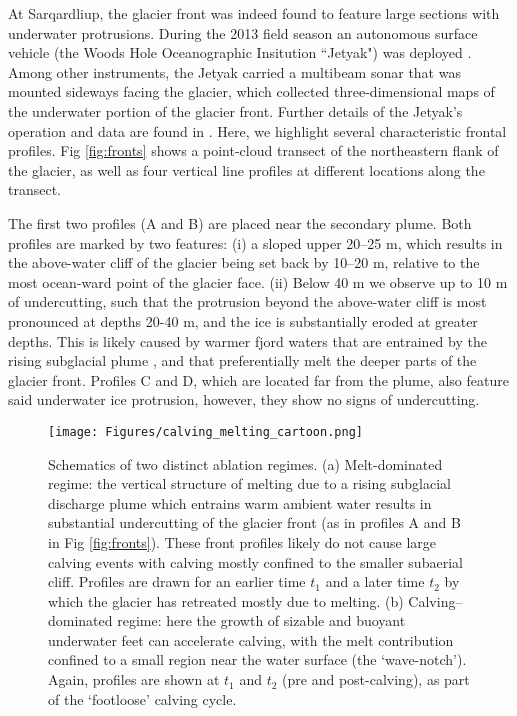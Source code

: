 \documentclass[10pt,letterpaper]{article}
\begin{document}
At Sarqardliup, the glacier front was indeed found to feature large sections with underwater protrusions. During the 2013 field season an autonomous surface vehicle (the Woods Hole Oceanographic Insitution ``Jetyak") was deployed \citep{Kimball:kr,Mankoff:2016jp}.
Among other instruments, the Jetyak carried a multibeam sonar that was mounted sideways facing the glacier, which collected three-dimensional maps of the underwater portion of the glacier front. Further details of the Jetyak's operation and data are found in \cite{Kimball:kr}. Here, we highlight several characteristic frontal profiles. Fig \ref{fig:fronts} shows a point-cloud transect of the northeastern flank of the glacier, as well as four vertical line profiles at different locations along the transect. 

The first two profiles (A and B) are placed near the secondary plume. Both profiles are marked by two features: (i) a sloped upper 20--25 m, which results in the above-water cliff of the glacier being set back by 10--20 m, relative to the most ocean-ward point of the glacier face. (ii) Below 40 m we observe up to 10 m of undercutting, such that the protrusion beyond the above-water cliff is most pronounced at depths 20-40 m, and the ice is substantially eroded at greater depths. This is likely caused by warmer fjord waters that are entrained by the rising subglacial plume \citep{Fried:2015bc,Slater:2017dm}, and that preferentially melt the deeper parts of the glacier front. Profiles C and D, which are located far from the plume, also feature said underwater ice protrusion, however, they show no signs of undercutting. 

   \begin{figure*}[ht]
 \begin{centering}
  \texttt{[image: Figures/calving\_melting\_cartoon.png]}
  \caption{Schematics of two distinct ablation regimes. (a) Melt-dominated regime: the vertical structure of melting due to a rising subglacial discharge plume which entrains warm ambient water results in substantial undercutting of the glacier front (as in profiles A and B in Fig \ref{fig:fronts}). These front profiles likely do not cause large calving events with calving mostly confined to the smaller subaerial cliff. Profiles are drawn for an earlier time $t_1$ and a later time $t_2$ by which the glacier has retreated mostly due to melting. (b) Calving--dominated regime: here the growth of sizable and buoyant underwater feet can accelerate calving, with the melt contribution confined to a small region near the water surface (the `wave-notch'). Again, profiles are shown at $t_1$ and $t_2$ (pre and post-calving), as part of the `footloose' calving cycle.}
  \label{fig:regimes}
  \end{centering}
\end{figure*}
\end{document}
